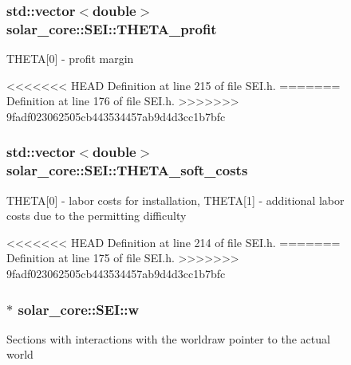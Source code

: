 \begin{figure}[H]
\begin{center}
\subsubsection[{T\+H\+E\+T\+A\+\_\+profit}]{\setlength{\rightskip}{0pt plus 5cm}std\+::vector$<$double$>$ solar\+\_\+core\+::\+S\+E\+I\+::\+T\+H\+E\+T\+A\+\_\+profit\hspace{0.3cm}{\ttfamily [protected]}}\label{classsolar__core_1_1_s_e_i_a9137f81a58ab1325d8b37590afe267aa}
T\+H\+E\+T\+A\mbox{[}0\mbox{]} -\/ profit margin 

<<<<<<< HEAD
Definition at line 215 of file S\+E\+I.\+h.
=======
Definition at line 176 of file S\+E\+I.\+h.
>>>>>>> 9fadf023062505cb443534457ab9d4d3cc1b7bfc

\hypertarget{classsolar__core_1_1_s_e_i_a1be690a943dc872af0ed3540c81f1d6b}{}
\subsubsection[{T\+H\+E\+T\+A\+\_\+soft\+\_\+costs}]{\setlength{\rightskip}{0pt plus 5cm}std\+::vector$<$double$>$ solar\+\_\+core\+::\+S\+E\+I\+::\+T\+H\+E\+T\+A\+\_\+soft\+\_\+costs\hspace{0.3cm}{\ttfamily [protected]}}\label{classsolar__core_1_1_s_e_i_a1be690a943dc872af0ed3540c81f1d6b}
T\+H\+E\+T\+A\mbox{[}0\mbox{]} -\/ labor costs for installation, T\+H\+E\+T\+A\mbox{[}1\mbox{]} -\/ additional labor costs due to the permitting difficulty 

<<<<<<< HEAD
Definition at line 214 of file S\+E\+I.\+h.
=======
Definition at line 175 of file S\+E\+I.\+h.
>>>>>>> 9fadf023062505cb443534457ab9d4d3cc1b7bfc

\hypertarget{classsolar__core_1_1_s_e_i_a82e0c6b5f6d83639a08c1bc357fd3466}{}
\subsubsection[{w}]{$\ast$ solar\+\_\+core\+::\+S\+E\+I\+::w\hspace{0.3cm}{\ttfamily [protected]}}\label{classsolar__core_1_1_s_e_i_a82e0c6b5f6d83639a08c1bc357fd3466}
Sections with interactions with the worldraw pointer to the actual world 


\end{center}
\end{figure}
